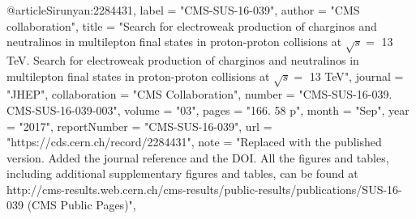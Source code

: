@article{Sirunyan:2284431,
      label          = "CMS-SUS-16-039",
      author        = "{CMS collaboration}",
      title         = "{Search for electroweak production of charginos and
                       neutralinos in multilepton final states in proton-proton
                       collisions at $\sqrt{s} = $ 13 TeV. Search for electroweak
                       production of charginos and neutralinos in multilepton
                       final states in proton-proton collisions at $\sqrt{s}=$ 13
                       TeV}",
      journal       = "JHEP",
      collaboration = "CMS Collaboration",
      number        = "CMS-SUS-16-039. CMS-SUS-16-039-003",
      volume        = "03",
      pages         = "166. 58 p",
      month         = "Sep",
      year          = "2017",
      reportNumber  = "CMS-SUS-16-039",
      url           = "https://cds.cern.ch/record/2284431",
      note          = "Replaced with the published version. Added the journal
                       reference and the DOI. All the figures and tables,
                       including additional supplementary figures and tables, can
                       be found at
                       http://cms-results.web.cern.ch/cms-results/public-results/publications/SUS-16-039
                       (CMS Public Pages)",
}

